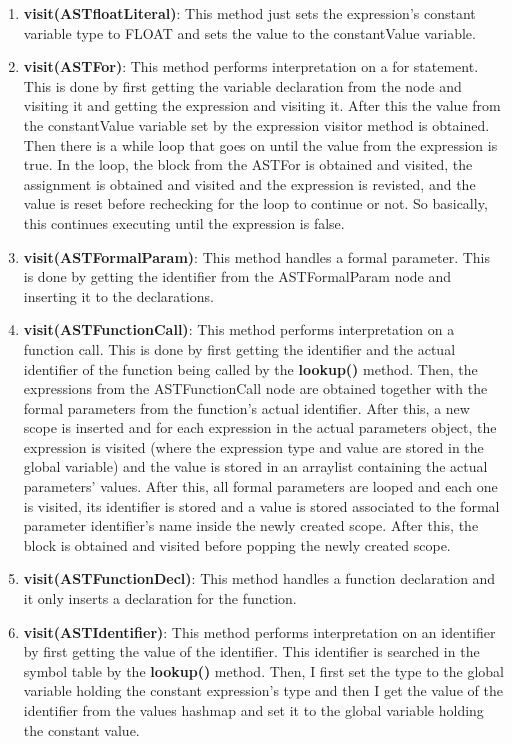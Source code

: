 \documentclass{article}
\begin{document}
\begin{enumerate}
					\item \textbf{visit(ASTfloatLiteral)}: This method just sets the expression's constant variable type to FLOAT and sets the value to the constantValue variable.
					
					\item \textbf{visit(ASTFor)}:  This method performs interpretation on a for statement. This is done by first getting the variable declaration from the node and visiting it and getting the expression and visiting it. After this the value from the constantValue variable set by the expression visitor method is obtained. Then there is a while loop that goes on until the value from the expression is true. In the loop, the block from the ASTFor is obtained and visited, the assignment is obtained and visited and the expression is revisted, and the value is reset before rechecking for the loop to continue or not. So basically, this continues executing until the expression is false.
			
					\item \textbf{visit(ASTFormalParam)}: This method handles a formal parameter. This is done by getting the identifier from the ASTFormalParam node and inserting it to the declarations.
					
					\item \textbf{visit(ASTFunctionCall)}: This method performs interpretation on a function call. This is done by first getting the identifier and the actual identifier of the function being called by the \textbf{lookup()} method.   Then, the expressions from the ASTFunctionCall node are obtained together with the formal parameters from the function's actual identifier. After this, a new scope is inserted and for each expression in the actual parameters object, the expression is visited (where the expression type and value are stored in the global variable) and the value is stored in an arraylist containing the actual parameters' values. After this, all formal parameters are looped and each one is visited, its identifier is stored and a value is stored associated to the formal parameter identifier's name inside the newly created scope. After this, the block is obtained and visited before popping the newly created scope.
				
					\item \textbf{visit(ASTFunctionDecl)}: This method handles a function declaration and it only inserts a declaration for the function.
			
					\item \textbf{visit(ASTIdentifier)}: This method performs interpretation on an identifier by first getting the value of the identifier. This identifier is searched in the symbol table by the \textbf{lookup()} method. Then, I first set the type to the global variable holding the constant expression's type and then I get the value of the identifier from the values hashmap and set it to the global variable holding the constant value.
					

\end{enumerate}
\end{document}

